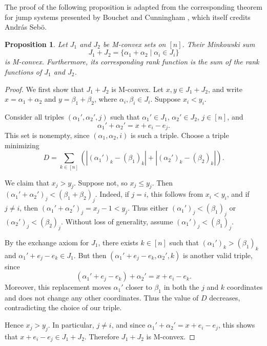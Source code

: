 \documentclass[10pt,a4paper]{amsart}
\newtheorem{proposition}[theorem]{Proposition}
\begin{document}
The proof of the following proposition is adapted from the corresponding
theorem for jump systems presented by Bouchet and Cunningham
\cite{bouchetCunninghamDeltaMatroidsJumpSystems}, which itself credits
Andr\'as Seb\"o.

\begin{proposition}\label{prop:sum_polymatroid_is_polymatroid}
    Let $J_1$ and $J_2$ be M-convex sets on $[n]$. Their Minkowski sum
    \[
        J_1+J_2
        =
        \{\alpha_1+\alpha_2\mid\alpha_i\in J_i\}
    \]
    is M-convex. Furthermore, its corresponding rank function is the sum
    of the rank functions of $J_1$ and $J_2$.
\end{proposition}

\begin{proof}
    We first show that $J_1+J_2$ is M-convex. Let $x,y\in J_1+J_2$, and
    write $x=\alpha_1+\alpha_2$ and $y=\beta_1+\beta_2$, where
    $\alpha_i,\beta_i\in J_i$. Suppose $x_i<y_i$.

    Consider all triples $(\alpha_1',\alpha_2',j)$ such that
    $\alpha_1'\in J_1$, $\alpha_2'\in J_2$, $j\in[n]$, and
    \[
        \alpha_1'+\alpha_2'=x+e_i-e_j.
    \]
    This set is nonempty, since $(\alpha_1,\alpha_2,i)$ is such a triple.
    Choose a triple minimizing
    \[
        D
        =
        \sum_{k\in[n]}
        \left(
            |(\alpha_1')_k-(\beta_1)_k|
            +
            |(\alpha_2')_k-(\beta_2)_k|
        \right).
    \]

    We claim that $x_j>y_j$. Suppose not, so $x_j\leq y_j$. Then
    $(\alpha_1'+\alpha_2')_j<(\beta_1+\beta_2)_j$. Indeed, if $j=i$,
    this follows from $x_i<y_i$, and if $j\neq i$, then
    $(\alpha_1'+\alpha_2')_j=x_j-1<y_j$. Thus either
    $(\alpha_1')_j<(\beta_1)_j$ or
    $(\alpha_2')_j<(\beta_2)_j$. Without loss of generality, assume
    $(\alpha_1')_j<(\beta_1)_j$.

    By the exchange axiom for $J_1$, there exists $k\in[n]$ such that
    $(\alpha_1')_k>(\beta_1)_k$ and
    $\alpha_1'+e_j-e_k\in J_1$. But then
    $(\alpha_1'+e_j-e_k,\alpha_2',k)$ is another valid triple, since
    \[
        (\alpha_1'+e_j-e_k)+\alpha_2'=x+e_i-e_k.
    \]
    Moreover, this replacement moves $\alpha_1'$ closer to $\beta_1$ in
    both the $j$ and $k$ coordinates and does not change any other
    coordinates. Thus the value of $D$ decreases, contradicting the choice
    of our triple.

    Hence $x_j>y_j$. In particular, $j\neq i$, and since
    $\alpha_1'+\alpha_2'=x+e_i-e_j$, this shows that
    $x+e_i-e_j\in J_1+J_2$. Therefore $J_1+J_2$ is M-convex.


\end{proof}
\end{document}
